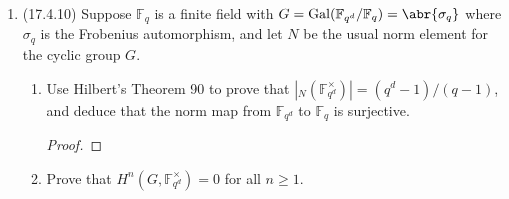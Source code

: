 \documentclass[11pt]{article}
\newcommand{\cbr}[1]{\left\{#1\right\}}
\DeclareMathOperator{\Gal}{Gal}
\DeclareMathOperator{\im}{im}
\DeclareMathOperator{\Hom}{Hom}
\DeclareMathOperator{\Ext}{Ext}
\begin{document}
\begin{enumerate}
\begin{proof}
        Now let $\cbr{P_i}$ be a projective resolution of $\mathbb{Z}G$-modules for $\mathbb{Z}$: \[\cdots\to P_n\to\cdots\to P_1\to P_0\to \mathbb{Z}\to 0\] Apply the $\Hom_{\mathbb{Z}G}(-,B)$ functor to obtain the cochain complex (removing the first group) \[0\to \Hom_{\mathbb{Z}G}(P_0,B)\xrightarrow{d_1} \Hom_{\mathbb{Z}G}(P_1,B)\xrightarrow{d_2}\cdots\xrightarrow{d_n} \Hom_{\mathbb{Z}G}(P_n,B)\xrightarrow{d_{n+1}}\cdots.\] The cohomology of this complex is given by the groups $\Ext_{\mathbb{Z}G}^i(\mathbb{Z},B) = \ker{d_{i+1}}/\im{d_i}$. Using the tensor-hom adjunction we produce isomorphisms $f_i\colon \Hom_{\mathbb{Z}G}(P_i,B)\to \Hom_\mathbb{Z}(P_i,A)$; produce the cochain complex (is still a cochain complex since the $f_i$ are isomorphisms) \[0\to \Hom_\mathbb{Z}(P_0,A)\xrightarrow{f_1d_1f_0^{-1}} \Hom_\mathbb{Z}(P_1,A)\xrightarrow{f_2d_2f_1^{-1}}\cdots\xrightarrow{f_nd_nf_{n-1}^{-1}} \Hom_\mathbb{Z}(P_n,A)\xrightarrow{f_{n+1}d_{n+1}f_n^{-1}}\cdots.\] The cohomology of this complex is isomorphic to the cohomology of the previous complex given since the $f_i$ are isomorphisms: we have $\ker{d_{i+1}}\cong \ker(f_{i+1}d_{i+1}f_i^{-1})$ and $\im{d_i}\cong \im(f_id_if_{i-1}^{-1})$. So $\Ext_{\mathbb{Z}G}^n(\mathbb{Z},B)\cong \Ext_\mathbb{Z}^n(\mathbb{Z},A)$ as needed. But for $n>0$, $\Ext_\mathbb{Z}^n(\mathbb{Z},A)$ since $\mathbb{Z}$ is a projective (free) $\mathbb{Z}$-module.
    \end{proof}
    \item (17.4.10) Suppose $\mathbb{F}_q$ is a finite field with $G= \Gal(\mathbb{F}_{q^d}/\mathbb{F}_q) = \abr{\sigma_q}$ where $\sigma_q$ is the Frobenius automorphism, and let $N$ be the usual norm element for the cyclic group $G$. \begin{enumerate}
        \item Use Hilbert's Theorem 90 to prove that $|{}_N(\mathbb{F}_{q^d}^\times)| = (q^d-1)/(q-1)$, and deduce that the norm map from $\mathbb{F}_{q^d}$ to $\mathbb{F}_q$ is surjective. \begin{proof}
        
        \end{proof}
        \item Prove that $H^n(G,\mathbb{F}_{q^d}^\times) = 0$ for all $n\geq 1$.
    \end{enumerate}
\end{enumerate}
\end{document}
